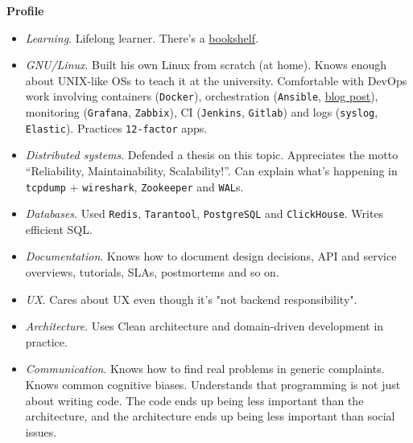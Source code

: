 \documentclass[final]{letter}
\def\code#1{\texttt{#1}}
\begin{document}
{\bf Profile}
\begin{itemize}
  \item \textit{Learning}. Lifelong learner. There's a \href{https://www.goodreads.com/review/list/43338630-sergey-machulskis?shelf=professional}{bookshelf}.
  \item \textit{GNU/Linux}. Built his own Linux from scratch (at home). Knows enough about UNIX-like OSs to teach it at the university.
  Comfortable with DevOps work involving containers (\code{Docker}),
   orchestration (\code{Ansible}, \href{https://neexee.github.io/posts-en/ansible-secrets/}{blog post}),
   monitoring (\code{Grafana}, \code{Zabbix}), CI (\code{Jenkins}, \code{Gitlab})
   and logs (\code{syslog}, \code{Elastic}). Practices \code{12-factor} apps.
  \item \textit{Distributed systems}. Defended a thesis on this topic. Appreciates the motto ``Reliability, Maintainability, Scalability!''.
    Can explain what's happening in \code{tcpdump} + \code{wireshark}, \code{Zookeeper} and \code{WAL}s.
  \item \textit{Databases}. Used \code{Redis}, \code{Tarantool}, \code{PostgreSQL} and \code{ClickHouse}. Writes efficient SQL.
  \item \textit{Documentation}. Knows how to document design decisions, API and service overviews, tutorials, SLAs, postmortems and so on.
  \item \textit{UX}. Cares about UX even though it's "not backend responsibility".
  \item \textit{Architecture}. Uses Clean architecture and domain-driven development in practice.
  \item \textit{Communication}. Knows how to find real problems in generic complaints. 
    Knows common cognitive biases.
    Understands that programming is not just about writing code. The code ends up being less important than the architecture, and the architecture ends up being less important than social issues. 
\end{itemize}
\end{document}
